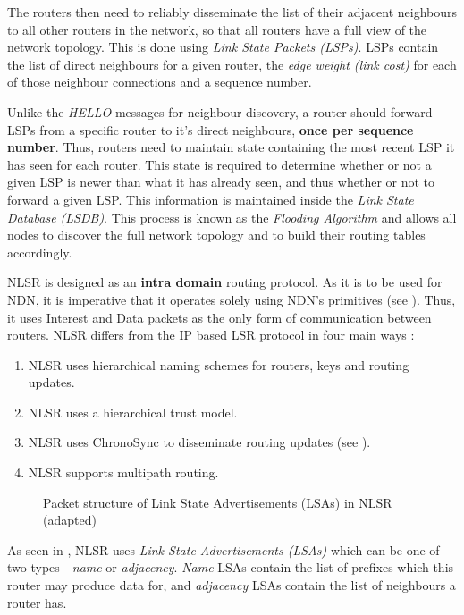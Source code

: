 The routers then need to reliably disseminate the list of their adjacent neighbours to all other routers in the network, so that all routers have a full view of the network topology. This is done using \textit{Link State Packets (LSPs)}. LSPs contain the list of direct neighbours for a given router, the \textit{edge weight (link cost)} for each of those neighbour connections and a sequence number. 

Unlike the \textit{HELLO} messages for neighbour discovery, a router should forward LSPs from a specific router to it's direct neighbours, \textbf{once per sequence number}. Thus, routers need to maintain state containing the most recent LSP it has seen for each router. This state is required to determine whether or not a given LSP is newer than what it has already seen, and thus whether or not to forward a given LSP. This information is maintained inside the \textit{Link State Database (LSDB)}. This process is known as the \textit{Flooding Algorithm} and allows all nodes to discover the full network topology and to build their routing tables accordingly.

NLSR is designed as an \textbf{intra domain} routing protocol. As it is to be used for NDN, it is imperative that it operates solely using NDN's primitives (see ). Thus, it uses Interest and Data packets as the only form of communication between routers. NLSR differs from the IP based LSR protocol in four main ways \cite{nlsr}:

\begin{enumerate}
    \item NLSR uses hierarchical naming schemes for routers, keys and routing updates.
    \item NLSR uses a hierarchical trust model.
    \item NLSR uses ChronoSync to disseminate routing updates (see ).
    \item NLSR supports multipath routing.
\end{enumerate}

\begin{figure}[H]
    \centering
    \caption{Packet structure of Link State Advertisements (LSAs) in NLSR \cite{nlsr} (adapted)}
    \label{fig:nlsr-lsa}
\end{figure}

As seen in , NLSR uses \textit{Link State Advertisements (LSAs)} which can be one of two types - \textit{name} or \textit{adjacency}. \textit{Name} LSAs contain the list of prefixes which this router may produce data for, and \textit{adjacency} LSAs contain the list of neighbours a router has.

